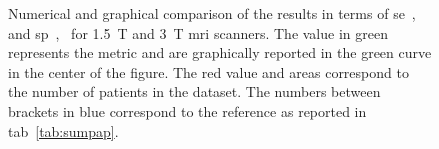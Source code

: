 \begin{figure}
{
  }
  \hspace*{\fill}
  \caption[Comparison of the state-of-the-art results in terms of \acs*{se} and \acs*{sp}.]{Numerical and graphical comparison of the results in terms of \acs*{se}~,~ and \acs*{sp}~,~ for \SI{1.5}{\tesla} and \SI{3}{\tesla} \ac{mri} scanners. The value in {\color{semiAuto}green} represents the metric and are graphically reported in the {\color{semiAuto}green} curve in the center of the figure. The {\color{red}red} value and areas correspond to the number of patients in the dataset. The numbers between brackets in {\color{blue}blue} correspond to the reference as reported in \acs{tab}~\ref{tab:sumpap}.}
  \label{fig:sensspec}
\end{figure}
